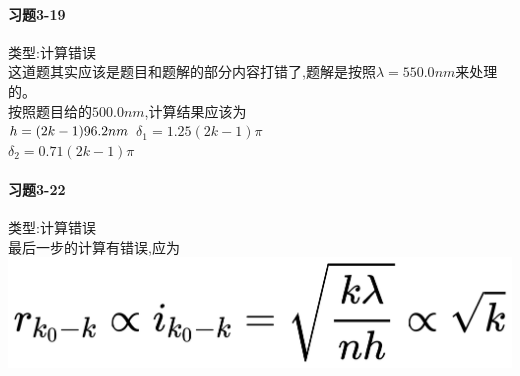 \documentclass[a4paper,11pt]{ctexart}
\newtheorem{thm}{定理}[section]
\begin{document}
\paragraph{习题3-19}类型:计算错误\\
这道题其实应该是题目和题解的部分内容打错了,题解是按照$\lambda=550.0nm$来处理的。\\
按照题目给的$500.0nm$,计算结果应该为\\
$h =(2k-1)96.2nm \\$
$\delta_1 = 1.25(2k-1) \pi $\\
$\delta_2 = 0.71(2k-1) \pi $\\

\paragraph{习题3-22}类型:计算错误\\
最后一步的计算有错误,应为\\
\includegraphics[scale = 0.04]{2.jpg}


\end{document}
